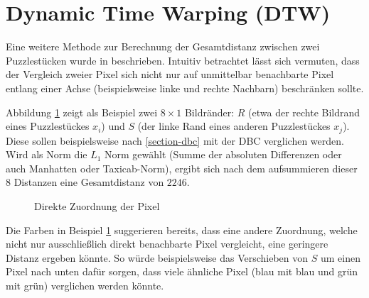 \documentclass{whswinvcbook}
\begin{document}
\section{Dynamic Time Warping (DTW)}\label{section-dtw}
Eine weitere Methode zur Berechnung der Gesamtdistanz zwischen zwei Puzzlestücken wurde in \cite{hungarian} beschrieben. Intuitiv betrachtet lässt sich vermuten, dass der Vergleich zweier Pixel sich nicht nur auf unmittelbar benachbarte Pixel entlang einer Achse (beispielsweise linke und rechte Nachbarn) beschränken sollte.

Abbildung \ref{fig-dtw-ex} zeigt als Beispiel zwei $8\times1$ Bildränder: $R$ (etwa der rechte Bildrand eines Puzzlestückes $x_i$) und $S$ (der linke Rand eines anderen Puzzlestückes $x_j$). Diese sollen beispielsweise nach \ref{section-dbc} mit der DBC verglichen werden. Wird als Norm die $L_1$ Norm gewählt (Summe der absoluten Differenzen oder auch Manhatten oder Taxicab-Norm), ergibt sich nach dem aufsummieren dieser $8$ Distanzen eine Gesamtdistanz von $2246$.
\begin{figure}[H]
    \centering
    \quad\quad\quad\quad
    \caption{Direkte Zuordnung der Pixel}
    \label{fig-dtw-ex}
\end{figure}
Die Farben in Beispiel \ref{fig-dtw-ex} suggerieren bereits, dass eine andere Zuordnung, welche nicht nur ausschließlich direkt benachbarte Pixel vergleicht, eine geringere Distanz ergeben könnte. So würde beispielsweise das Verschieben von $S$ um einen Pixel nach unten dafür sorgen, dass viele ähnliche Pixel (blau mit blau und grün mit grün) verglichen werden könnte.
\end{document}
